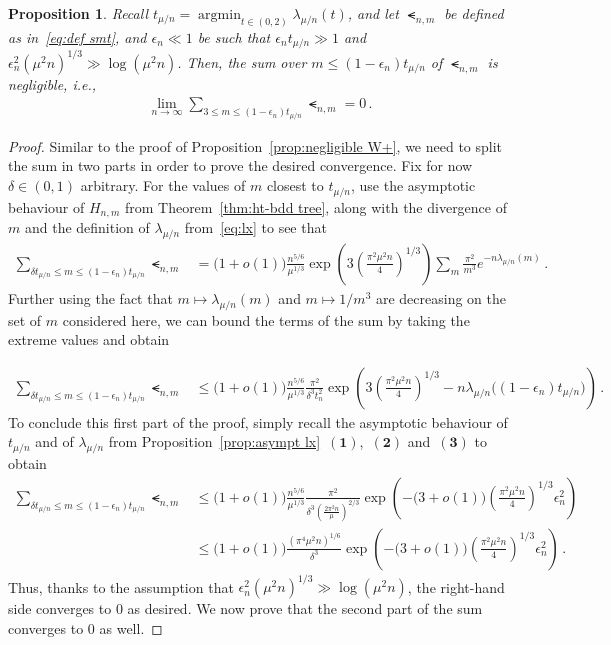 \documentclass{article}
\DeclareMathOperator*{\argmin}{argmin}
\newcommand{\1}{\mathbbm{1}}								%
\newtheorem{proposition}[theorem]{Proposition}
\theoremstyle{definition}
\numberwithin{equation}{section}
\newcommand{\numitem}[1]{$\mathbf{(#1)}$}
\begin{document}
\begin{proposition}\label{prop:negligible W-}
    {Recall $t_{\mu/n}=\argmin_{t \in (0,2)}\lambda_{\mu/n}(t)$, and} let $\smt_{n,m}$ be defined as in~\eqref{eq:def smt}, and $\epsilon_n\ll1$ be such that $\epsilon_nt_{\mu/n}\gg1$ and $\epsilon_n^2(\mu^2n)^{1/3}\gg\log(\mu^2n)$.
    Then, the sum over $m\leq(1-\epsilon_n)t_{\mu/n}$ of $\smt_{n,m}$ is negligible, i.e.,
    \begin{align*}
        \lim_{n\rightarrow\infty}\sum_{3\leq m\leq(1-\epsilon_n)t_{\mu/n}}\smt_{n,m}=0\,.
    \end{align*}
\end{proposition}

\begin{proof}
    Similar to the proof of Proposition~\ref{prop:negligible W+}, we need to split the sum in two parts in order to prove the desired convergence.
    Fix for now $\delta\in(0,1)$ arbitrary.
    For the values of $m$ closest to $t_{\mu/n}$, use the asymptotic behaviour of $H_{n,m}$ from Theorem~\ref{thm:ht-bdd tree}, along with the divergence of $m$ and the definition of $\lambda_{\mu/n}$ from~\eqref{eq:lx} to see that
    \begin{align*}
        \sum_{\delta t_{\mu/n}\leq m\leq(1-\epsilon_n)t_{\mu/n}}\smt_{n,m}&=\big(1+o(1)\big)\frac{n^{5/6}}{\mu^{1/3}}\exp\left(3\left(\frac{\pi^2\mu^2n}{4}\right)^{1/3}\right)\sum_m\frac{\pi^2}{m^3}e^{-n\lambda_{\mu/n}(m)}\,.
    \end{align*}
    Further using the fact that $m\mapsto\lambda_{\mu/n}(m)$ and $m\mapsto1/m^3$ are decreasing on the set of $m$ considered here, we can bound the terms of the sum by taking the extreme values and obtain
  
    \begin{align*}
        \sum_{\delta t_{\mu/n}\leq m\leq(1-\epsilon_n)t_{\mu/n}}\smt_{n,m}&\leq\big(1+o(1)\big)\frac{n^{5/6}}{\mu^{1/3}}\frac{\pi^2}{\delta^3t_n^2}\exp\left(3\left(\frac{\pi^2\mu^2n}{4}\right)^{1/3}-n\lambda_{\mu/n}\big((1-\epsilon_n)t_{\mu/n}\big)\right)\,.
    \end{align*}
    To conclude this first part of the proof, simply recall the asymptotic behaviour of $t_{\mu/n}$ and of $\lambda_{\mu/n}$ from Proposition~\ref{prop:asympt lx}~\numitem{1},~\numitem{2} and~\numitem{3} to obtain
    \begin{align*}
        \sum_{\delta t_{\mu/n}\leq m\leq(1-\epsilon_n)t_{\mu/n}}\smt_{n,m}&\leq\big(1+o(1)\big)\frac{n^{5/6}}{\mu^{1/3}}\frac{\pi^2}{\delta^3\left(\frac{2\pi^2n}{\mu}\right)^{2/3}}\exp\left(-\big(3+o(1)\big)\left(\frac{\pi^2\mu^2n}{4}\right)^{1/3}\epsilon_n^2\right)\\
        &\leq\big(1+o(1)\big)\frac{(\pi^4\mu^2n)^{1/6}}{\delta^3}\exp\left(-\big(3+o(1)\big)\left(\frac{\pi^2\mu^2n}{4}\right)^{1/3}\epsilon_n^2\right)\,.
    \end{align*}
    Thus, thanks to the assumption that $\epsilon_n^2(\mu^2n)^{1/3}\gg\log(\mu^2n)$, the right-hand side converges to $0$ as desired.
    We now prove that the second part of the sum converges to $0$ as well.


\end{proof}
\end{document}
